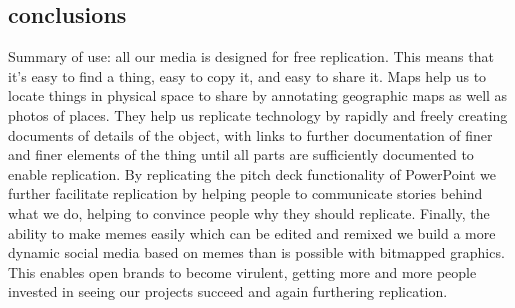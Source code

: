 \subsection{conclusions}

Summary of use: all our media is designed for free replication.  This means that it's easy to find a thing, easy to copy it, and easy to share it.  Maps help us to locate things in physical space to share by annotating geographic maps as well as photos of places.  They help us replicate technology by rapidly and freely creating documents of details of the object, with links to further documentation of finer and finer elements of the thing until all parts are sufficiently documented to enable replication.  By replicating the pitch deck functionality of PowerPoint we further facilitate replication by helping people to communicate stories behind what we do, helping to convince people why they should replicate.  Finally, the ability to make memes easily which can be edited and remixed we build a more dynamic social media based on memes than is possible with bitmapped graphics.  This enables open brands to become virulent, getting more and more people invested in seeing our projects succeed and again furthering replication.





